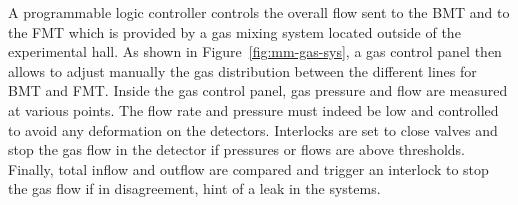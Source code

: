 A programmable logic controller controls the overall flow sent to the BMT and to the FMT which is provided by a gas mixing system located outside of the experimental hall. As shown in Figure~\ref{fig:mm-gas-sys}, a gas control panel then allows to adjust manually the gas distribution between the different lines for BMT and FMT. Inside the gas control panel, gas pressure and flow are measured at various points. The flow rate and pressure must indeed be low and controlled to avoid any deformation on the detectors. Interlocks are set to close valves and stop the gas flow in the detector if pressures or flows are above thresholds. 
Finally, total inflow and outflow are compared and trigger an interlock to stop the gas flow if in disagreement, hint of a leak in the systems. 

 